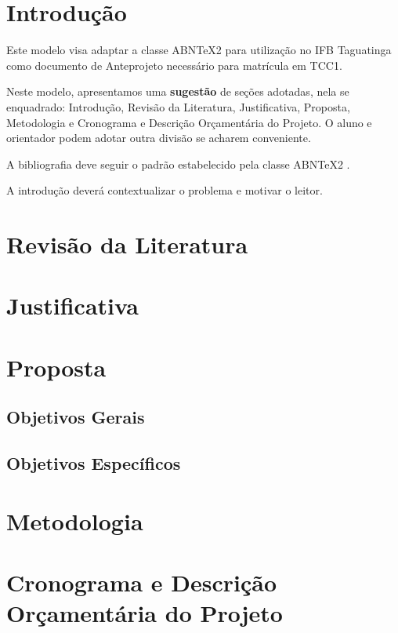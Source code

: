\documentclass[licenciatura]{pre-projeto-computacao}
\begin{document}
\frenchspacing 
\imprimircapa
\imprimirfolhaderosto*




\section*{Introdução}
	Este modelo visa adaptar a classe ABNTeX2 para utilização no IFB Taguatinga como documento de Anteprojeto necessário para matrícula em TCC1.
	
	
	Neste modelo, apresentamos uma \textbf{sugestão} de seções adotadas, nela se enquadrado: Introdução, Revisão da Literatura, Justificativa, Proposta, Metodologia e Cronograma e Descrição Orçamentária do Projeto. O aluno e orientador podem adotar outra divisão se acharem conveniente.
	
	A bibliografia deve seguir o padrão estabelecido pela classe ABNTeX2 \cite{abntex2modelo-relatorio}.
	
	A introdução deverá contextualizar o problema e motivar o leitor.
\section*{Revisão da Literatura}

\section*{Justificativa}

\section*{Proposta}

\subsection*{Objetivos Gerais}
\subsection*{Objetivos Específicos}

\section*{Metodologia}

\section*{Cronograma e Descrição Orçamentária do Projeto}



\end{document}
